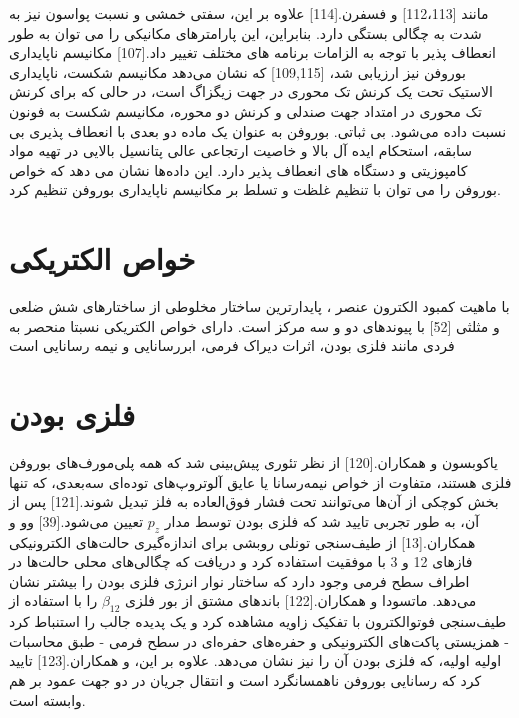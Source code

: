 مانند  \cite{liIdealStrengthPhonon2012, zouPredictingDislocationsGrain2013}[112،113] و فسفرن.\cite{weiSuperiorMechanicalFlexibility2014}[114] علاوه بر این، سفتی خمشی و نسبت پواسون نیز به شدت به چگالی  بستگی دارد. بنابراین، این پارامترهای مکانیکی را می توان به طور انعطاف پذیر با توجه به الزامات برنامه های مختلف تغییر داد.\cite{zhangElasticityFlexibilityIdeal2017}[107] مکانیسم ناپایداری بوروفن نیز ارزیابی شد، \cite{wangStrainEffectsBorophene2016, zhongElectronicMechanicalProperties2018, weiSuperiorMechanicalFlexibility2014, zouPredictingDislocationsGrain2013}[109,115] که نشان می‌دهد مکانیسم شکست، ناپایداری الاستیک تحت یک کرنش تک محوری در جهت زیگزاگ است، در حالی که برای کرنش تک محوری در امتداد جهت صندلی و کرنش دو محوره، مکانیسم شکست به فونون نسبت داده می‌شود. بی ثباتی. بوروفن به عنوان یک ماده دو بعدی با انعطاف پذیری بی سابقه، استحکام ایده آل بالا و خاصیت ارتجاعی عالی پتانسیل بالایی در تهیه مواد کامپوزیتی و دستگاه های انعطاف پذیر دارد. این داده‌ها نشان می دهد که خواص بوروفن را می توان با تنظیم غلظت  و تسلط بر مکانیسم ناپایداری بوروفن تنظیم کرد.

\section{خواص الکتریکی}
با ماهیت کمبود الکترون عنصر ، پایدارترین ساختار مخلوطی از ساختارهای شش ضلعی و مثلثی \cite{tangNovelPrecursorsBoron2007}[52] با پیوندهای دو و سه مرکز است. دارای خواص الکتریکی نسبتا منحصر به فردی مانند فلزی بودن، اثرات دیراک فرمی، ابررسانایی و نیمه رسانایی است
\section{فلزی بودن}
یاکوبسون و همکاران.\cite{penevCanTwoDimensionalBoron2016}[120] از نظر تئوری پیش‌بینی شد که همه پلی‌مورف‌های بوروفن فلزی هستند، متفاوت از خواص نیمه‌رسانا یا عایق آلوتروپ‌های توده‌ای سه‌بعدی، که تنها بخش کوچکی از آن‌ها می‌توانند تحت فشار فوق‌العاده به فلز تبدیل شوند.\cite{eremetsSuperconductivityBoron2001}[121] پس از آن، به طور تجربی تایید شد که فلزی بودن توسط مدار $p_z$ تعیین می‌شود.\cite{shangTwoDimensionalBoron2018}[39] وو و همکاران.\cite{fengExperimentalRealizationTwodimensional2016}[13] از طیف‌سنجی تونلی روبشی برای اندازه‌گیری حالت‌های الکترونیکی فازهای 12 و 3 با موفقیت استفاده کرد و دریافت که چگالی‌های محلی حالت‌ها در اطراف سطح فرمی وجود دارد که ساختار نوار انرژی فلزی بودن را بیشتر نشان می‌دهد. ماتسودا و همکاران.\cite{fengDirectEvidenceMetallic2016}[122] باندهای مشتق از بور فلزی $\beta_{12}$ را با استفاده از طیف‌سنجی فوتوالکترون با تفکیک زاویه مشاهده کرد و یک پدیده جالب را استنباط کرد - همزیستی پاکت‌های الکترونیکی و حفره‌های حفره‌ای در سطح فرمی - طبق محاسبات اولیه اولیه، که فلزی بودن آن را نیز نشان می‌دهد. علاوه بر این،  و همکاران.\cite{padilhaDirectionalDependenceElectronic2016}[123] تایید کرد که رسانایی بوروفن ناهمسانگرد است و انتقال جریان در دو جهت عمود بر هم وابسته است.
